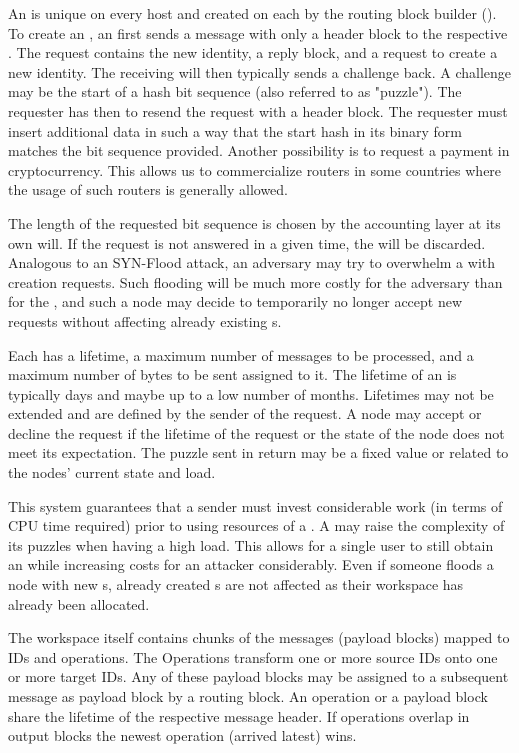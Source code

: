 An  is unique on every host and created on each \VortexNode{} by the routing block builder (). To create an , an  first sends a message with only a header block to the respective \VortexNode. The request contains the new identity, a reply block, and a request to create a new identity. The receiving \VortexNode will then typically sends a challenge back. A challenge may be the start of a hash bit sequence (also referred to as "puzzle"). The requester has then to resend the request with a header block. The requester must insert additional data in such a way that the start hash in its binary form matches the bit sequence provided. Another possibility is to request a payment in cryptocurrency. This allows us to commercialize routers in some countries where the usage of such routers is generally allowed.

The length of the requested bit sequence is chosen by the accounting layer at its own will. If the request is not answered in a given time, the  will be discarded. Analogous to an SYN-Flood attack, an adversary may try to overwhelm a \VortexNode{} with  creation requests. Such flooding will be much more costly for the adversary than for the \VortexNode{}, and such a node may decide to temporarily no longer accept new  requests without affecting already existing s.

Each  has a lifetime, a maximum number of messages to be processed, and a maximum number of bytes to be sent assigned to it. The lifetime of an  is typically days and maybe up to a low number of months. Lifetimes may not be extended and are defined by the sender of the request. A node may accept or decline the request if the lifetime of the request or the state of the node does not meet its expectation. The puzzle sent in return may be a fixed value or related to the nodes' current state and load.

This system guarantees that a sender must invest considerable work (in terms of CPU time required) prior to using resources of a \VortexNode. A \VortexNode{} may raise the complexity of its puzzles when having a  high load. This allows for a single user to still obtain an  while increasing costs for an attacker considerably. Even if someone floods a node with new s, already created s are not affected as their workspace has already been allocated.

The workspace itself contains chunks of the messages (payload blocks) mapped to IDs and operations. The Operations transform one or more source IDs onto one or more target IDs. Any of these payload blocks may be assigned to a subsequent message as payload block by a routing block. An operation or a payload block share the lifetime of the respective message header. If operations overlap in output blocks the newest operation (arrived latest) wins.

